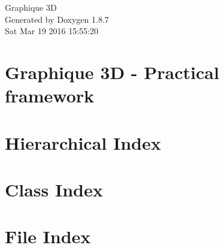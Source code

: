 \documentclass[twoside]{book}
\newcommand{\+}{\discretionary{\mbox{\scriptsize$\hookleftarrow$}}{}{}}
\newcommand{\clearemptydoublepage}{%
  \newpage{\pagestyle{empty}\cleardoublepage}%
}
\begin{document}
\hypersetup{pageanchor=false,
             bookmarks=true,
             bookmarksnumbered=true,
             pdfencoding=unicode
            }
\begin{titlepage}
\vspace*{7cm}
\begin{center}%
{\Large Graphique 3\+D }\\
\vspace*{1cm}
{\large Generated by Doxygen 1.8.7}\\
\vspace*{0.5cm}
{\small Sat Mar 19 2016 15:55:20}\\
\end{center}
\end{titlepage}
\clearemptydoublepage
\tableofcontents
\clearemptydoublepage
{}
\hypersetup{pageanchor=true}

\chapter{Graphique 3\+D -\/ Practical framework}
\label{index}\hypertarget{index}{}
\chapter{Hierarchical Index}

\chapter{Class Index}

\chapter{File Index}

\end{document}
